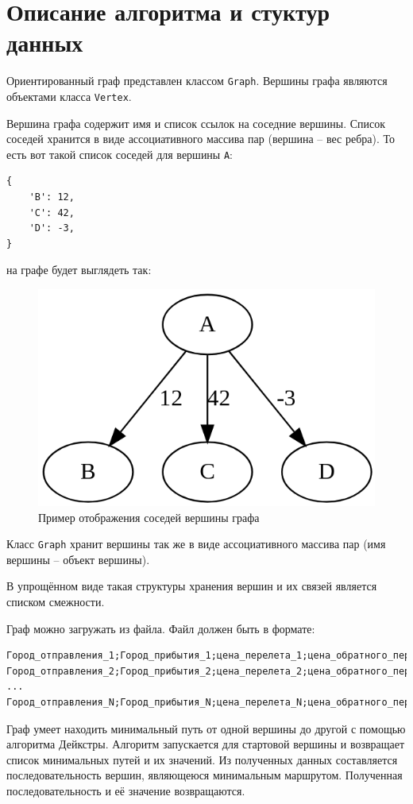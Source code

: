 \section{Описание алгоритма и стуктур данных}

Ориентированный граф представлен классом \verb|Graph|.
Вершины графа являются объектами класса \verb|Vertex|.

Вершина графа содержит имя и список ссылок на соседние вершины.
Список соседей хранится в виде ассоциативного массива 
пар (вершина -- вес ребра). 
То есть вот такой список соседей для вершины \verb|A|:

\begin{lstlisting}
{
    'B': 12,
    'C': 42,
    'D': -3,
}
\end{lstlisting}

на графе будет выглядеть так:

\begin{figure}[H]
    \centering
    \includegraphics[width=0.7\linewidth]{photo/neighbors_example}
    \caption{Пример отображения соседей вершины графа}
    \label{fig:neighbors_example}
\end{figure}

Класс \verb|Graph| хранит вершины так же в виде ассоциативного массива 
пар (имя вершины -- объект вершины).

В упрощённом виде такая структуры хранения вершин и их связей
является списком смежности.

Граф можно загружать из файла.
Файл должен быть в формате:

\begin{verbatim}
Город_отправления_1;Город_прибытия_1;цена_перелета_1;цена_обратного_перелета_1
Город_отправления_2;Город_прибытия_2;цена_перелета_2;цена_обратного_перелета_1
...
Город_отправления_N;Город_прибытия_N;цена_перелета_N;цена_обратного_перелета_N
\end{verbatim}

Граф умеет находить минимальный путь от одной вершины до другой 
с помощью алгоритма Дейкстры. 
Алгоритм запускается для стартовой вершины и 
возвращает список минимальных путей и их значений.
Из полученных данных составляется последовательность
вершин, являющеюся минимальным маршрутом.
Полученная последовательность и её значение возвращаются.
